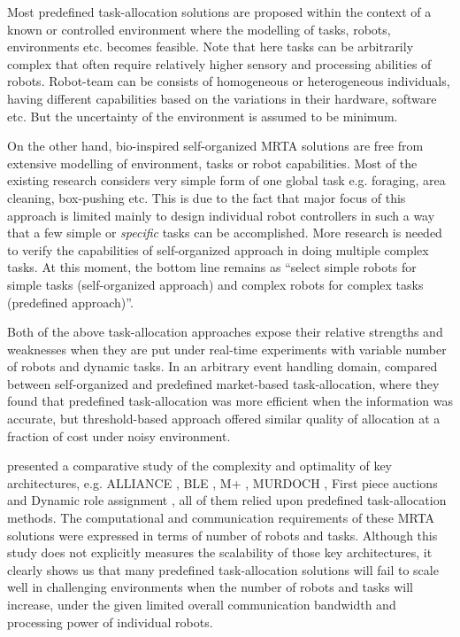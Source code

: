 \documentclass[final,5p,times,twocolumn]{elsarticle}
\begin{document}
Most predefined task-allocation solutions are proposed within the context of a known or controlled environment where the modelling of tasks, robots, environments etc. becomes feasible. Note that here tasks can be arbitrarily complex that often require relatively higher sensory and processing abilities of robots. Robot-team can be consists of homogeneous or heterogeneous individuals, having different capabilities based on the variations in their hardware, software etc. But the uncertainty of the environment is assumed to be minimum. 

On the other hand, bio-inspired self-organized MRTA solutions are free from extensive modelling of environment, tasks or robot capabilities. Most of the existing research considers very simple form of one global task e.g. foraging, area cleaning, box-pushing etc. This is due to the fact that major focus of this approach is limited mainly to design individual robot controllers in such a way that a few simple  or {\em specific} tasks can be accomplished. More research is needed to verify the capabilities of self-organized approach in doing multiple complex tasks. At this moment, the bottom line remains as ``select simple robots for simple tasks (self-organized approach) and complex robots for complex tasks (predefined approach)''.

Both of the above task-allocation approaches expose their relative strengths and weaknesses when they are put under real-time experiments with variable number of robots and dynamic tasks. In an arbitrary event handling domain, \citet{kalra+2007}  compared between self-organized and predefined market-based task-allocation,  where they found that predefined  task-allocation was more efficient when the information was accurate, but threshold-based  approach offered similar quality of allocation at a fraction of cost  under noisy environment.  

\citet{Gerkey+2003} presented a comparative study of  the complexity and optimality of key architectures, e.g.  ALLIANCE \cite{Parker1998}, BLE \cite{Werger2001}, M+ \cite{Botelho+1999}, MURDOCH \cite{Gerkey+2002}, First piece auctions \cite{Zlot+2002} and Dynamic role assignment \cite{Chaimowicz2002}, all of them relied upon predefined task-allocation methods. The computational and communication requirements of these MRTA solutions were expressed in terms of number of robots and tasks. Although this study does not explicitly measures the scalability of those key architectures, it clearly shows us that many predefined task-allocation solutions will fail to scale well in challenging environments  when the number of  robots and tasks will increase, under the given limited overall communication bandwidth and processing power of individual robots. 
\end{document}
